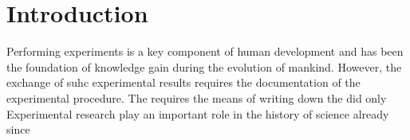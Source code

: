 \clearpage
\section{Introduction}
\label{sec:Intro}

Performing experiments is a key component of human development and has been the foundation of knowledge gain during the evolution of mankind. However, the exchange of suhc experimental results requires the documentation of the  experimental procedure. The  requires the means of writing down the did only Experimental research play an important role in the history of science already since 

%
% 
% 
% 
